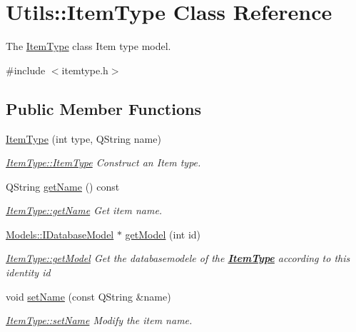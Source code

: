 \hypertarget{classUtils_1_1ItemType}{\section{Utils\+:\+:Item\+Type Class Reference}
\label{classUtils_1_1ItemType}
}


The \hyperlink{classUtils_1_1ItemType}{Item\+Type} class Item type model.  




{\ttfamily \#include $<$itemtype.\+h$>$}

\subsection*{Public Member Functions}
\begin{DoxyCompactItemize}
\item 
\hyperlink{classUtils_1_1ItemType_a5b06f6c289619f01ced33db7b16ab0f9}{Item\+Type} (int type, Q\+String name)
\begin{DoxyCompactList}\small\item\em \hyperlink{classUtils_1_1ItemType_a5b06f6c289619f01ced33db7b16ab0f9}{Item\+Type\+::\+Item\+Type} Construct an Item type. \end{DoxyCompactList}\item 
Q\+String \hyperlink{classUtils_1_1ItemType_a09fdb09837ad0ab678a271d3f97dd006}{get\+Name} () const 
\begin{DoxyCompactList}\small\item\em \hyperlink{classUtils_1_1ItemType_a09fdb09837ad0ab678a271d3f97dd006}{Item\+Type\+::get\+Name} Get item name. \end{DoxyCompactList}\item 
\hyperlink{classModels_1_1IDatabaseModel}{Models\+::\+I\+Database\+Model} $\ast$ \hyperlink{classUtils_1_1ItemType_a9341f4f165726aa1e31543d6c7233cd6}{get\+Model} (int id)
\begin{DoxyCompactList}\small\item\em \hyperlink{classUtils_1_1ItemType_a9341f4f165726aa1e31543d6c7233cd6}{Item\+Type\+::get\+Model} Get the databasemodele of the {\bfseries \hyperlink{classUtils_1_1ItemType}{Item\+Type}} according to this identity {\itshape id} \end{DoxyCompactList}\item 
void \hyperlink{classUtils_1_1ItemType_aa993c315def3988851fc3af5f826c384}{set\+Name} (const Q\+String \&name)
\begin{DoxyCompactList}\small\item\em \hyperlink{classUtils_1_1ItemType_aa993c315def3988851fc3af5f826c384}{Item\+Type\+::set\+Name} Modify the item name. \end{DoxyCompactList}\item 

\end{DoxyCompactItemize}
